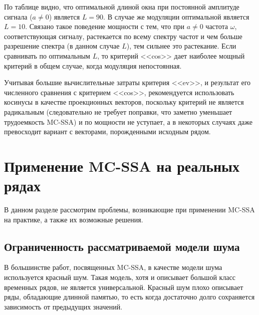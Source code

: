 \documentclass[specialist,
substylefile = spbu_report.rtx,
subf,12pt]{disser}
\theoremstyle{definition}
\begin{document}
По таблице видно, что оптимальной длиной окна при постоянной амплитуде сигнала ($a\ne0$) является $L=90$. В случае же модуляции оптимальной является $L=10$. Связано такое поведение мощности с тем, что при $a\ne0$ частота $\omega$, соответствующая сигналу, растекается по всему спектру частот и чем больше разрешение спектра (в данном случае $L$), тем сильнее это растекание. Если сравнивать по оптимальным $L$, то критерий <<cos>> дает наиболее мощный критерий в общем случае, когда модуляция непостоянная.

Учитывая большие вычислительные затраты критерия <<ev>>, и результат его численного сравнения с критерием <<cos>>, рекомендуется использовать косинусы в качестве проекционных векторов, поскольку критерий не является радикальным (следовательно не требует поправки, что заметно уменьшает трудоемкость MC-SSA) и по мощности не уступает, а в некоторых случаях даже превосходит вариант с векторами, порожденными исходным рядом.

\section{Применение MC-SSA на реальных рядах}

В данном разделе рассмотрим проблемы, возникающие при применении MC-SSA на практике, а также их возможные решения.

\subsection{Ограниченность рассматриваемой модели шума}

В большинстве работ, посвященных MC-SSA, в качестве модели шума используется красный шум. Такая модель, хотя и описывает большой класс временных рядов, не является универсальной. Красный шум плохо описывает ряды, обладающие длинной памятью, то есть когда достаточно долго сохраняется зависимость от предыдущих значений.  

\end{document}
